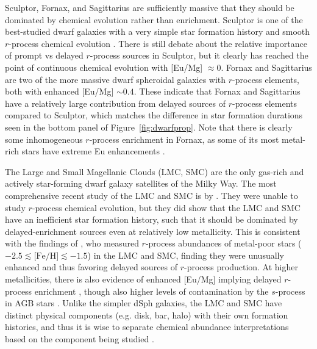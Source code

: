 \documentclass[letterpaper]{article}
\begin{document}
Sculptor, Fornax, and Sagittarius are sufficiently massive that they should be dominated by chemical evolution rather than enrichment. Sculptor is one of the best-studied dwarf galaxies with a very simple star formation history and smooth $r$-process chemical evolution \citep{Duggan2018, Hill2019, Skuladottir2019, Molero2021, delosReyes2022}. There is still debate about the relative importance of prompt vs delayed $r$-process sources in Sculptor, but it clearly has reached the point of continuous chemical evolution with [Eu/Mg] ${\approx}0$.
Fornax \citep{Letarte2010, Lemasle2014} and Sagittarius \citep{Bonifacio2000,McWilliam2013,Hansen2018} are two of the more massive dwarf spheroidal galaxies with $r$-process elements, both with enhanced [Eu/Mg] $\sim 0.4$. These indicate that Fornax and Sagittarius have a relatively large contribution from delayed sources of $r$-process elements compared to Sculptor, which matches the difference in star formation durations seen in the bottom panel of Figure~\ref{fig:dwarfprop}.
Note that there is clearly some inhomogeneous $r$-process enrichment in Fornax, as some of its most metal-rich stars have extreme Eu enhancements \citep{Reichert2021}.

The Large and Small Magellanic Clouds (LMC, SMC) are the only gas-rich and actively star-forming dwarf galaxy satellites of the Milky Way.
The most comprehensive recent study of the LMC and SMC is by \citet{Nidever2020}. They were unable to study $r$-process chemical evolution, but they did show that the LMC and SMC have an inefficient star formation history, such that it should be dominated by delayed-enrichment sources even at relatively low metallicity.
This is consistent with the findings of \citet{Reggiani2021}, who measured $r$-process abundances of metal-poor stars ($-2.5 \lesssim \mbox{[Fe/H]} \lesssim -1.5$) in the LMC and SMC, finding they were unusually enhanced and thus favoring delayed sources of $r$-process production.
At higher metallicities, there is also evidence of enhanced [Eu/Mg] implying delayed $r$-process enrichment \citep{Naidu2022}, though also higher levels of contamination by the $s$-process in AGB stars \citep{VanderSwaelmen2013}.
Unlike the simpler dSph galaxies, the LMC and SMC have distinct physical components (e.g. disk, bar, halo) with their own formation histories, and thus it is wise to separate chemical abundance interpretations based on the component being studied \citep[e.g.,][]{Pompeia2008, VanderSwaelmen2013,Reggiani2021}.
\end{document}
